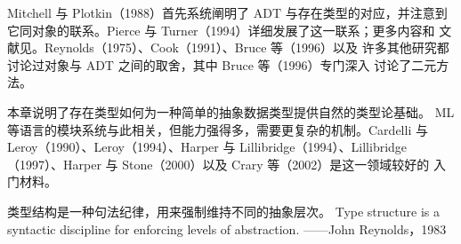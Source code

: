 Mitchell 与 Plotkin（1988）首先系统阐明了 ADT 与存在类型的对应，并注意到
它同对象的联系。Pierce 与 Turner（1994）详细发展了这一联系；更多内容和
文献见。Reynolds（1975）、Cook（1991）、Bruce 等（1996）以及
许多其他研究都讨论过对象与 ADT 之间的取舍，其中 Bruce 等（1996）专门深入
讨论了二元方法。

本章说明了存在类型如何为一种简单的抽象数据类型提供自然的类型论基础。
ML 等语言的模块系统与此相关，但能力强得多，需要更复杂的机制。Cardelli 与
Leroy（1990）、Leroy（1994）、Harper 与 Lillibridge（1994）、Lillibridge
（1997）、Harper 与 Stone（2000）以及 Crary 等（2002）是这一领域较好的
入门材料。

\bilingualepigraph
  {类型结构是一种句法纪律，用来强制维持不同的抽象层次。}
  {Type structure is a syntactic discipline for enforcing levels of abstraction.}
  {——John Reynolds，1983}
